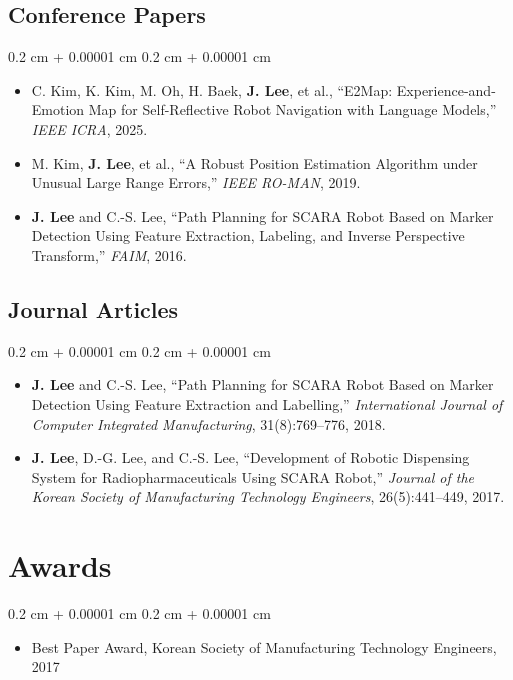 \documentclass[10pt, letterpaper]{article}
\newenvironment{highlights}{
    \begin{itemize}[
        topsep=0.10 cm,
        parsep=0.10 cm,
        partopsep=0pt,
        itemsep=0pt,
        leftmargin=0.4 cm + 10pt
    ]
}{
    \end{itemize}
} %
\newenvironment{onecolentry}{
    \begin{adjustwidth}{
        0.2 cm + 0.00001 cm
    }{
        0.2 cm + 0.00001 cm
    }
}{
    \end{adjustwidth}
} %
\begin{document}
\subsection*{Conference Papers}
\begin{onecolentry}
\begin{highlights}
    \item C. Kim, K. Kim, M. Oh, H. Baek, \textbf{J. Lee}, et al., ``E2Map: Experience-and-Emotion Map for Self-Reflective Robot Navigation with Language Models,'' \textit{IEEE ICRA}, 2025.
    \item M. Kim, \textbf{J. Lee}, et al., ``A Robust Position Estimation Algorithm under Unusual Large Range Errors,'' \textit{IEEE RO-MAN}, 2019.
    \item \textbf{J. Lee} and C.-S. Lee, ``Path Planning for SCARA Robot Based on Marker Detection Using Feature Extraction, Labeling, and Inverse Perspective Transform,'' \textit{FAIM}, 2016.
\end{highlights}
\end{onecolentry}

\subsection*{Journal Articles}
\begin{onecolentry}
\begin{highlights}
    \item \textbf{J. Lee} and C.-S. Lee, ``Path Planning for SCARA Robot Based on Marker Detection Using Feature Extraction and Labelling,'' \textit{International Journal of Computer Integrated Manufacturing}, 31(8):769--776, 2018.
    \item \textbf{J. Lee}, D.-G. Lee, and C.-S. Lee, ``Development of Robotic Dispensing System for Radiopharmaceuticals Using SCARA Robot,'' \textit{Journal of the Korean Society of Manufacturing Technology Engineers}, 26(5):441--449, 2017.
\end{highlights}
\end{onecolentry}

\section{Awards}
\begin{onecolentry}
\begin{highlights}
    \item Best Paper Award, Korean Society of Manufacturing Technology Engineers, 2017
\end{highlights}
\end{onecolentry}
\end{document}

